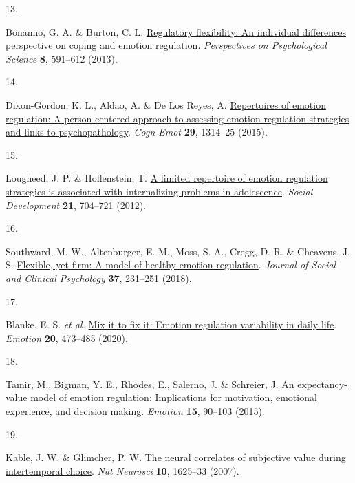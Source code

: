 \documentclass[
  man,floatsintext]{apa6}
\newlength{\cslhangindent}
\newlength{\csllabelwidth}
\newlength{\cslentryspacingunit} %
\newenvironment{CSLReferences}[2] %
 {%
  \setlength{\parindent}{0pt}
  \ifodd #1
  \let\oldpar\par
  \def\par{\hangindent=\cslhangindent\oldpar}
  \fi
  \setlength{\parskip}{#2\cslentryspacingunit}
 }%
 {}
\newcommand{\CSLLeftMargin}[1]{\parbox[t]{\csllabelwidth}{#1}}
\newcommand{\CSLRightInline}[1]{\parbox[t]{\linewidth - \csllabelwidth}{#1}\break}
\begin{document}
\begin{CSLReferences}{0}{0}
\leavevmode{}%
\CSLLeftMargin{13. }%
\CSLRightInline{Bonanno, G. A. \& Burton, C. L. \href{https://doi.org/10.1177/1745691613504116}{Regulatory flexibility: An individual differences perspective on coping and emotion regulation}. \emph{Perspectives on Psychological Science} \textbf{8}, 591--612 (2013).}

\leavevmode{}%
\CSLLeftMargin{14. }%
\CSLRightInline{Dixon-Gordon, K. L., Aldao, A. \& De Los Reyes, A. \href{https://doi.org/10.1080/02699931.2014.983046}{Repertoires of emotion regulation: A person-centered approach to assessing emotion regulation strategies and links to psychopathology}. \emph{Cogn Emot} \textbf{29}, 1314--25 (2015).}

\leavevmode{}%
\CSLLeftMargin{15. }%
\CSLRightInline{Lougheed, J. P. \& Hollenstein, T. \href{https://doi.org/10.1111/j.1467-9507.2012.00663.x}{A limited repertoire of emotion regulation strategies is associated with internalizing problems in adolescence}. \emph{Social Development} \textbf{21}, 704--721 (2012).}

\leavevmode{}%
\CSLLeftMargin{16. }%
\CSLRightInline{Southward, M. W., Altenburger, E. M., Moss, S. A., Cregg, D. R. \& Cheavens, J. S. \href{https://doi.org/DOI\%2010.1521/jscp.2018.37.4.231}{Flexible, yet firm: A model of healthy emotion regulation}. \emph{Journal of Social and Clinical Psychology} \textbf{37}, 231--251 (2018).}

\leavevmode{}%
\CSLLeftMargin{17. }%
\CSLRightInline{Blanke, E. S. \emph{et al.} \href{https://doi.org/10.1037/emo0000566}{Mix it to fix it: Emotion regulation variability in daily life}. \emph{Emotion} \textbf{20}, 473--485 (2020).}

\leavevmode{}%
\CSLLeftMargin{18. }%
\CSLRightInline{Tamir, M., Bigman, Y. E., Rhodes, E., Salerno, J. \& Schreier, J. \href{https://doi.org/10.1037/emo0000021}{An expectancy-value model of emotion regulation: Implications for motivation, emotional experience, and decision making}. \emph{Emotion} \textbf{15}, 90--103 (2015).}

\leavevmode{}%
\CSLLeftMargin{19. }%
\CSLRightInline{Kable, J. W. \& Glimcher, P. W. \href{https://doi.org/10.1038/nn2007}{The neural correlates of subjective value during intertemporal choice}. \emph{Nat Neurosci} \textbf{10}, 1625--33 (2007).}


\end{CSLReferences}
\end{document}
